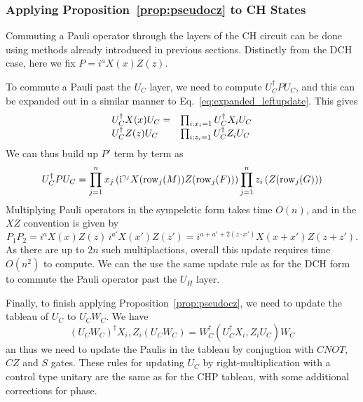 \subsubsection*{Applying Proposition~\ref{prop:pseudocz} to CH States}
Commuting a Pauli operator through the layers of the CH circuit can be done using methods already introduced in previous sections. Distinctly from the DCH case, here we fix $P=i^{a}X(x)Z(z)$.\par
To commute a Pauli past the $U_{C}$ layer, we need to compute $U_{C}^{\dagger}PU_{C}$, and this can be expanded out in a similar manner to Eq.~\ref{eq:expanded_leftupdate}. This gives
\[
\begin{array}{l l}
U_{C}^{\dagger}X(x)U_{C} = & \prod_{i:x_{i}=1}U_{C}^{\dagger}X_{i}U_{C}\\
U_{C}^{\dagger}Z(z)U_{C} & \prod_{i:z_{i}=1}U_{C}^{\dagger}Z_{i}U_{C}
\end{array}
\]
We can thus build up $P'$ term by term as
\begin{equation}
U_{C}^{\dagger}PU_{C} = \prod_{j=1}^{n}x_{j}\left(\mathrm{i}^{\gamma_{j}}X(\text{row}_{j}(M))Z(\text{row}_{j}(F))\right)\prod_{j=1}^{n}z_{i}\left(Z(\text{row}_{j}(G))\right)
\end{equation}
Multiplying Pauli operators in the sympelctic form takes time $O(n)$, and in the $XZ$ convention is given by
\[
P_{1}P_{2}= i^{a}X(x)Z(z)\,i^{a'}X(x')Z(z')=i^{a+a'+2(z\cdot x')} X(x+x')Z(z+z').
\] 
As there are up to $2n$ such multiplactions, overall this update requires time $O(n^{2})$ to compute. We can the use the same update rule as for the DCH form to commute the Pauli operator past the $U_{H}$ layer.\par
Finally, to finish applying Proposition~\ref{prop:pseudocz}, we need to update the tableau of $U_{C}$ to $U_{C}W_{C}$. We have
\[\left(U_{C}W_{C}\right)^{\dagger}X_{i},Z_{i}\left(U_{C}W_{C}\right) = W_{C}^{\dagger}\left(U_{C}^{\dagger}X_{i},Z_{i}U_{C}\right)W_{C}\]
an thus we need to update the Paulis in the tableau by conjugtion with $CNOT$, $CZ$ and $S$ gates. These rules for updating $U_{C}$ by right-multiplication with a control type unitary are the same as for the CHP tableau, with some additional corrections for phase.
